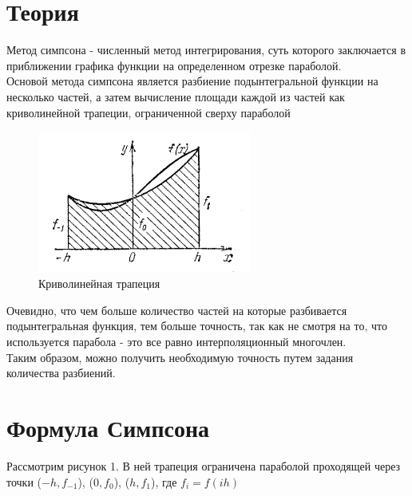 \documentclass[11pt, english]{article}
\begin{document}
\newcommand{\CC}{C\nolinebreak\hspace{-.05em}\raisebox{.4ex}{\tiny\bf +}\nolinebreak\hspace{-.10em}\raisebox{.4ex}{\tiny\bf +}}
\def\CC{{C\nolinebreak[4]\hspace{-.05em}\raisebox{.4ex}{\tiny\bf ++}}}


\section{Теория}

Метод симпсона - численный метод интегрирования, суть которого заключается в приближении графика функции на определенном отрезке параболой.\\

Основой метода симпсона является разбиение подынтегральной функции на несколько частей, а затем вычисление площади каждой из частей как криволинейной трапеции, ограниченной сверху параболой

\begin{center}
\begin{figure}[h!]
    \centering
    \includegraphics[width=7cm]{FS4iqxg.png}
    \caption{Криволинейная трапеция}
    \label{fig:my_label}
\end{figure}
    
\end{center}

Очевидно, что чем больше количество частей на которые разбивается подынтегральная функция, тем больше точность, так как не смотря на то, что используется парабола - это все равно интерполяционный многочлен.\\

Таким образом, можно получить необходимую точность путем задания количества разбиений.

\section{Формула Симпсона}
Рассмотрим рисунок 1. В ней трапеция ограничена параболой проходящей через точки ($-h, f_{-1}$), ($0, f_0$), ($h, f_1$), где $f_i = f(ih)$
\end{document}
